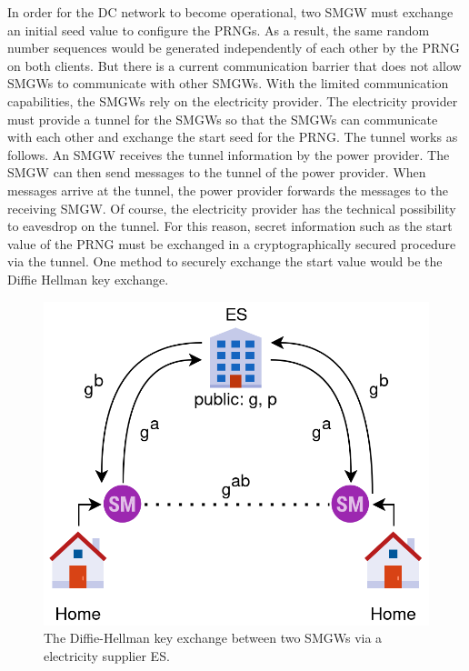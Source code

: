 In order for the DC network to become operational, two \gls{SMGW} must exchange an initial seed value to configure the \gls{PRNG}s. %
As a result, the same random number sequences would be generated independently of each other by the \gls{PRNG} on both clients. But there is a current communication barrier that does not allow \gls{SMGW}s to communicate with other \gls{SMGW}s. With the limited communication capabilities, the \gls{SMGW}s rely on the electricity provider. The electricity provider must provide a tunnel for the \gls{SMGW}s so that the \gls{SMGW}s can communicate with each other and exchange the start seed for the \gls{PRNG}. The tunnel works as follows. An \gls{SMGW} receives the tunnel information by the power provider. The \gls{SMGW} can then send messages to the tunnel of the power provider. When messages arrive at the tunnel, the power provider forwards the messages to the receiving \gls{SMGW}. Of course, the electricity provider has the technical possibility to eavesdrop on the tunnel. For this reason, secret information such as the start value of the \gls{PRNG} must be exchanged in a cryptographically secured procedure via the tunnel. One method to securely exchange the start value would be the Diffie Hellman key exchange.\\
\begin{figure}[tbp]
  \centering
  \includegraphics[scale=0.7]{images/key_exchange2.png}
  \caption[Diffie-Hellman Key Exchange in TR-03109]{The Diffie-Hellman key exchange between two SMGWs via a electricity supplier \gls{ES}.}
  \label{fig:keyexchange}
\end{figure}
